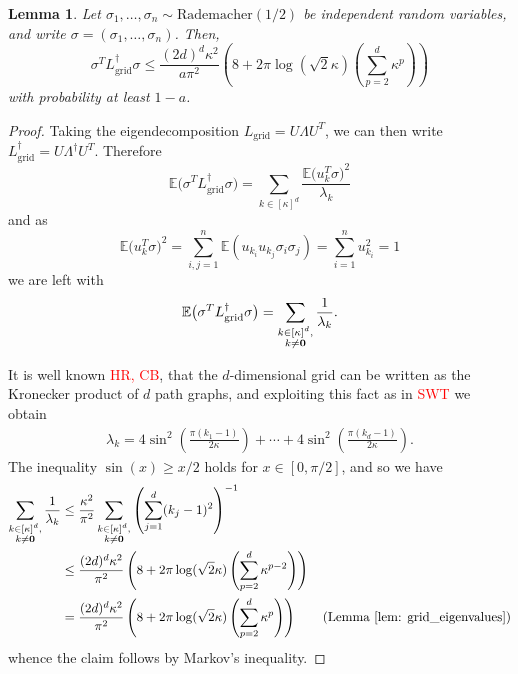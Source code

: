 \documentclass{article}
\newcommand{\1}{\mathbb{I}}
\newcommand{\Lgrid}{L_{\grid}}
\newcommand{\Linvgrid}{L_{\grid}^{\dagger}}
\newcommand{\Ebb}{\mathbb{E}}
\newcommand{\grid}{\mathrm{grid}}
\theoremstyle{alden}
\theoremstyle{aldenthm}
\newtheorem{lemma}{Lemma}
\theoremstyle{definition}
\theoremstyle{remark}
\begin{document}
\begin{lemma}
	\label{lem: noise_quadratic_form_on_grid}
	Let $\sigma_1, \ldots, \sigma_n \sim \mathrm{Rademacher}(1/2)$ be independent random variables, and write $\sigma = (\sigma_1, \ldots, \sigma_n)$. Then, 
	\begin{equation*}
	\sigma^T \Linvgrid \sigma \leq \frac{(2d)^d\kappa^2}{a\pi^2} \left(8 + 2\pi \log(\sqrt{2} \kappa) \left(\sum_{p = 2}^{d}\kappa^{p}\right) \right)
	\end{equation*}
	with probability at least $1  - a$.
\end{lemma}
\begin{proof}
	Taking the eigendecomposition $\Lgrid = U \Lambda U^T$, we can then write $\Linvgrid = U \Lambda^{\dagger} U^T$. Therefore
	\begin{equation*}
	\Ebb \bigl(\sigma^T \Linvgrid \sigma\bigr) = \sum_{k \in [\kappa]^d} \frac{\Ebb \bigl(u_{k}^T \sigma\bigr)^2}{\lambda_k}
	\end{equation*}
	and as 
	\begin{equation*}
	\Ebb \bigl(u_{k}^T \sigma\bigr)^2 = \sum_{i,j = 1}^{n} \Ebb(u_{k_i} u_{k_j} \sigma_i \sigma_j) = \sum_{i = 1}^{n} u_{k_i}^2 = 1
	\end{equation*}
	we are left with
	\begin{equation}
	\label{eqn: noise_quadratic_form_on_grid_1}
	\Ebb \bigl(\sigma^T \Linvgrid \sigma\bigr) = \sum_{\substack{k \in [\kappa]^d, \\ k \neq \bf{0}}} \frac{1}{\lambda_k}.
	\end{equation}
	
	It is well known \textcolor{red}{HR, CB}, that the $d$-dimensional grid can be written as the Kronecker product of $d$ path graphs, and exploiting this fact as in \textcolor{red}{SWT} we obtain
	\begin{align*}
	\lambda_{k} = 4 \sin^2\left(\frac{\pi(k_1 - 1)}{2 \kappa}\right) + \cdots + 4 \sin^2\left(\frac{\pi(k_d - 1)}{2 \kappa}\right).
	\end{align*}
	The inequality $\sin(x) \geq x/2$ holds for $x \in [0,\pi/2]$, and so we have
	\begin{align*}
	\sum_{\substack{k \in [\kappa]^d, \\ k \neq \bf{0}}} \frac{1}{\lambda_k} & \leq \frac{\kappa^2}{\pi^2} \sum_{\substack{k \in [\kappa]^d, \\ k \neq \bf{0}}} \left(\sum_{j = 1}^{d} (k_j - 1)^2\right)^{-1} \\
	& \leq \frac{(2d)^d\kappa^2}{\pi^2} \left(8 + 2\pi \log(\sqrt{2} \kappa) \left(\sum_{p = 2}^{d}\kappa^{p - 2}\right) \right) \\
	& = \frac{(2d)^d\kappa^2}{\pi^2} \left(8 + 2\pi \log(\sqrt{2} \kappa) \left(\sum_{p = 2}^{d}\kappa^{p}\right) \right) \tag{Lemma \ref{lem: grid_eigenvalues}}
	\end{align*}
	whence the claim follows by Markov's inequality.
\end{proof}
\end{document}
